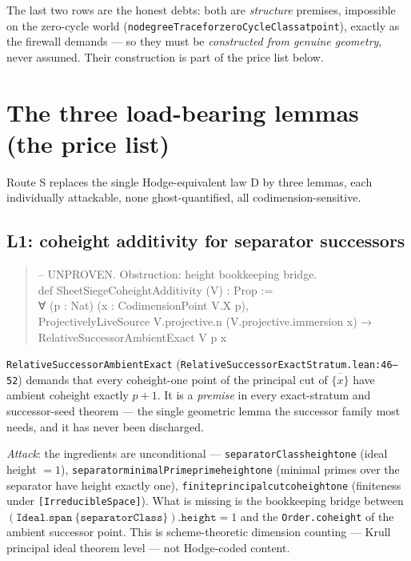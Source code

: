 \documentclass[11pt]{article}
\renewcommand{\_}{\textunderscore\allowbreak}
\begin{document}
\medskip
\noindent The last two rows are the honest debts: both are \emph{structure}
premises, impossible on the zero-cycle world
(\texttt{no\_degreeTrace\_for\_zeroCycleClass\_at\_point}),
exactly as the firewall demands --- so they must be \emph{constructed from
genuine geometry}, never assumed. Their construction is part of the price list
below.

\section{The three load-bearing lemmas (the price list)}\label{sec:lemmas}

Route S replaces the single Hodge-equivalent law D by three lemmas, each
individually attackable, none ghost-quantified, all codimension-sensitive.

\subsection{L1: coheight additivity for separator successors}

\begin{quote}\small\ttfamily
-- UNPROVEN. Obstruction: height bookkeeping bridge.\\
def SheetSiegeCoheightAdditivity (V) : Prop :=\\
\phantom{~}∀ (p : Nat) (x : CodimensionPoint V.X p),\\
\phantom{~~}ProjectivelyLiveSource V.projective.n (V.projective.immersion x) →\\
\phantom{~~}RelativeSuccessorAmbientExact V p x
\end{quote}
\texttt{RelativeSuccessorAmbientExact} (\texttt{RelativeSuccessorExactStratum.lean:46--52})
demands that every coheight-one point of the principal cut of $\overline{\{x\}}$
have ambient coheight exactly $p+1$. It is a \emph{premise} in every
exact-stratum and successor-seed theorem --- the single geometric lemma the
successor family most needs, and it has never been discharged.

\emph{Attack}: the ingredients are unconditional ---
\texttt{separatorClass\_height\_one} (ideal height $=1$),
\texttt{separator\_minimalPrime\_prime\_height\_one} (minimal primes over the
separator have height exactly one), \texttt{finite\_principal\_cut\_coheight\_one}
(finiteness under \texttt{[IrreducibleSpace]}). What is missing is the
bookkeeping bridge between $(\texttt{Ideal.span}\ \{\texttt{separatorClass}\}).\texttt{height} = 1$
and the \texttt{Order.coheight} of the ambient successor point. This is
scheme-theoretic dimension counting --- Krull principal ideal theorem level ---
not Hodge-coded content.
\end{document}
